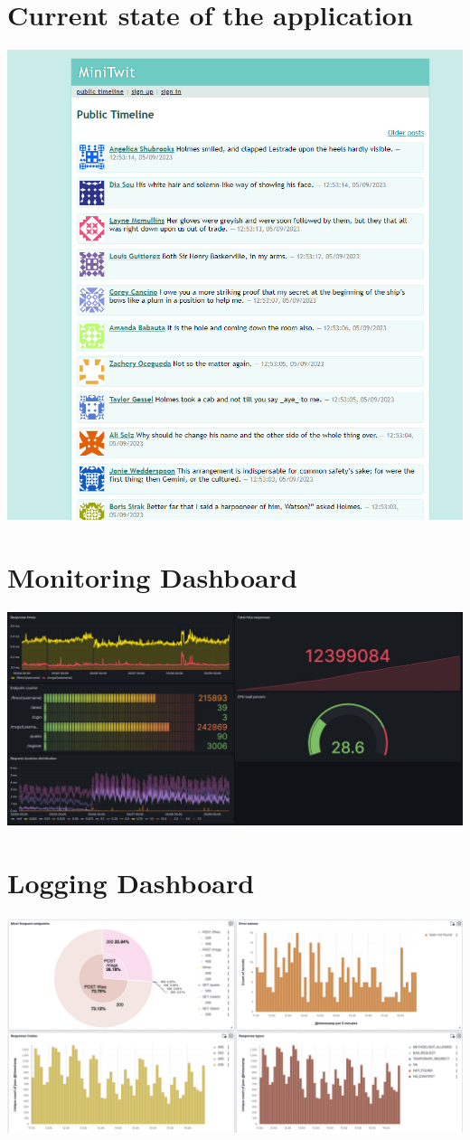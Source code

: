 \section{Current state of the application}
\label{appendix:currentState}
\includegraphics[width=1\textwidth]{images/OpsDev_screenshot.png}

\section{Monitoring Dashboard}
\label{appendix:monitoringDashboard}
\includegraphics[width=1\textwidth]{images/MonitoringDashboard.jpg}

\section{Logging Dashboard}
\label{appendix:loggingDashboard}
\includegraphics[width=1\textwidth]{images/LoggingDashboard.png}
